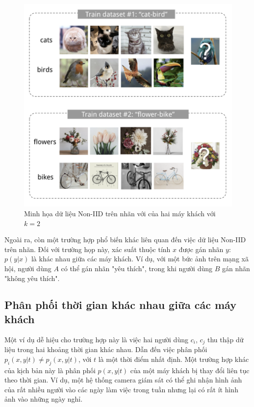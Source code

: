 \begin{figure}[H]
    \centering
    \includegraphics[scale=0.7]{../images/noniid_label.png}
    \caption{Minh họa dữ liệu Non-IID trên nhãn với của hai máy khách với $k=2$}
    \label{fig:my_noniid}
\end{figure}

Ngoài ra, còn một trường hợp phổ biến khác liên quan đến việc dữ liệu Non-IID trên nhãn. Đối với trường họp này, xác suất thuộc tính $x$ được gán nhãn $y$: $p(y|x)$ là khác nhau giữa các máy khách. Ví dụ, với một bức ảnh trên mạng xã hội, người dùng $A$ có thể gán nhãn "yêu thích", trong khi người dùng $B$ gán nhãn "không yêu thích".

\subsection{Phân phối thời gian khác nhau giữa các máy khách}

Một ví dụ dễ hiệu cho trường hợp này là việc hai người dùng $c_i$, $c_j$ thu thập dữ liệu trong hai khoảng thời gian khác nhau. Dẫn đến việc phân phối $p_i(x, y|t) \ne p_j(x, y|t)$, với $t$ là một thời điểm nhất định. Một trường hợp khác của kịch bản này là phân phối $p(x, y|t)$ của một máy khách bị thay đổi liên tục theo thời gian. Ví dụ, một hệ thống camera giám sát có thể ghi nhận hình ảnh của rất nhiều người vào các ngày làm việc trong tuần nhưng lại có rất ít hình ảnh vào những ngày nghỉ.

